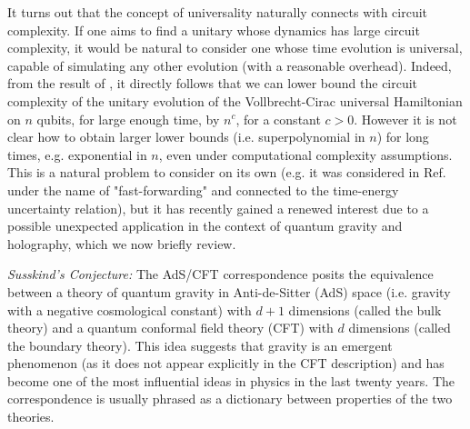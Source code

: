 \documentclass[11pt,letterpaper]{article}
\newcommand{\<}{\langle}
\renewcommand{\>}{\rangle}
\begin{document}
It turns out that the concept of universality naturally connects with circuit complexity. If one aims to find a unitary whose dynamics has large circuit complexity, it would be natural to consider one whose time evolution is universal, capable of simulating any other evolution (with a reasonable overhead). Indeed, from the result of \cite{brandao2012local}, it directly follows that we can lower bound the circuit complexity of the unitary evolution of the Vollbrecht-Cirac universal Hamiltonian \cite{VC} on $n$ qubits, for large enough time, by $n^{c}$, for a constant $c > 0$. However it is not clear how to obtain larger lower bounds (i.e. superpolynomial in $n$) for long times, e.g. exponential in $n$, even under computational complexity assumptions. This is a natural problem to consider on its own (e.g. it was considered in Ref. \cite{atia2016fast} under the name of "fast-forwarding" and connected to the time-energy uncertainty relation), but it has recently gained a renewed interest due to a possible unexpected application in the context of quantum gravity and holography, which we now briefly review.  

\vspace{0,2 cm}


\noindent \textit{Susskind's Conjecture:} The AdS/CFT correspondence \cite{JM} posits the equivalence between a theory of quantum gravity in Anti-de-Sitter (AdS) space (i.e. gravity with a negative cosmological constant) with $d+1$ dimensions (called the bulk theory) and a quantum conformal field theory (CFT) with $d$ dimensions (called the boundary theory). This idea suggests that gravity is an emergent phenomenon (as it does not appear explicitly in the CFT description) and has become one of the most influential ideas in physics in the last twenty years. The correspondence is usually phrased as a dictionary between properties of the two theories. 
\end{document}
